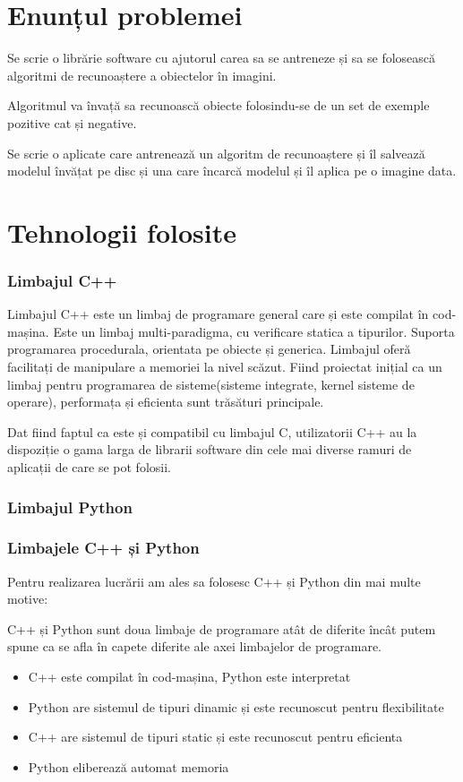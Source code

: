\section{Enunțul problemei}
Se scrie o librărie software cu ajutorul carea sa se antreneze și sa se folosească algoritmi de recunoaștere a obiectelor în imagini.

Algoritmul va învață sa recunoască obiecte folosindu-se de un set de exemple pozitive cat și negative.

Se scrie o aplicate care antrenează un algoritm de recunoaștere și îl salvează modelul învățat pe disc și una care încarcă modelul și îl aplica pe o imagine data.


\section{Tehnologii folosite}

\subsubsection{Limbajul C++}

Limbajul C++ este un limbaj de programare general care și este compilat în cod-mașina.
Este un limbaj multi-paradigma, cu verificare statica a tipurilor. 
Suporta programarea procedurala, orientata pe obiecte și generica.
Limbajul oferă facilitați de manipulare a memoriei la nivel scăzut.
Fiind proiectat inițial ca un limbaj pentru programarea de sisteme(sisteme integrate, kernel sisteme de operare), performața și eficienta sunt trăsături principale.

Dat fiind faptul ca este și compatibil cu limbajul C, utilizatorii C++ au la dispoziție o gama larga de librarii software din cele mai diverse ramuri de aplicații de care se pot folosii.

\subsubsection{Limbajul Python}



\subsubsection{Limbajele C++ și Python}
Pentru realizarea lucrării am ales sa folosesc C++ și Python din mai multe motive:

C++ și Python sunt doua limbaje de programare atât de diferite încât putem spune ca se afla în capete diferite ale axei limbajelor de programare.
\begin{itemize}
	\item C++ este compilat în cod-mașina, Python este interpretat
	\item Python are sistemul de tipuri dinamic și este recunoscut pentru flexibilitate
	\item C++ are sistemul de tipuri static și este recunoscut pentru eficienta
	\item Python eliberează automat memoria
\end{itemize}

